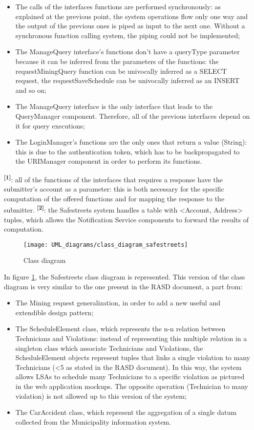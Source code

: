 \begin{itemize}
    \item The calls of the interfaces functions are performed synchronously: as explained at the previous point, the system operations flow only one way and the output of the previous ones is piped as input to the next one. Without a synchronous function calling system, the piping could not be implemented;
    \item The ManageQuery interface's functions don't have a queryType parameter because it can be inferred from the parameters of the functions: the requestMiningQuery function can be univocally inferred as a SELECT request, the requestSaveSchedule can be univocally inferred as an INSERT and so on;
    \item The ManageQuery interface is the only interface that leads to the QueryManager component. Therefore, all of the previous interfaces depend on it for query executions;
    \item The LoginManager's functions are the only ones that return a value (String): this is due to the authentication token, which has to be backpropagated to the URIManager component in order to perform its functions.
\end{itemize}
\textbf{\textsuperscript{[1]}}: all of the functions of the interfaces that requires a response have the submitter's account as a parameter: this is both necessary for the specific computation of the offered functions and for mapping the response to the submitter.\newline
\textbf{\textsuperscript{[2]}}: the Safestreets system handles a table with <Account, Address> tuples, which allows the Notification Service components to forward the results of computation.
\begin{figure}[H]
    \centering
    \texttt{[image: UML\_diagrams/class\_diagram\_safestreets]}
    \caption{Class diagram}
    \label{fig:class_diagram}
\end{figure}
In figure \ref{fig:class_diagram}, the Safestreets class diagram is represented. This version of the class diagram is very similar to the one present in the RASD document, a part from:
\begin{itemize}
    \item The Mining request generalization, in order to add a new useful and extendible design pattern;
    \item The ScheduleElement class, which represents the n-n relation between Technicians and Violations: instead of representing this multiple relation in a singleton class which associate Technicians and Violations, the ScheduleElement objects represent tuples that links a single violation to many Technicians (<5 as stated in the RASD document). In this way, the system allows LSAs to schedule many Technicians to a specific violation as pictured in the web application mockups. The opposite operation (Technician to many violation) is not allowed up to this version of the system;
    \item The CarAccident class, which represent the aggregation of a single datum collected from the Municipality information system.
\end{itemize}
